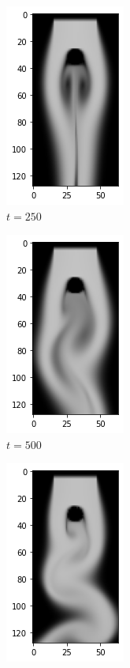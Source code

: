 \documentclass[a4paper,12pt,twoside]{report}
\begin{document}
\begin{figure}
	\centering
	\begin{subfigure}{0.18\textwidth}
		\centering
		\includegraphics[scale=0.5]{karmanflow/vgg_density_000250.png}
		\caption{$t=250$}
	\end{subfigure}
	\begin{subfigure}{0.18\textwidth}
		\centering
		\includegraphics[scale=0.5]{karmanflow/vgg_density_000500.png}
		\caption{$t=500$}
	\end{subfigure}
	\begin{subfigure}{0.18\textwidth}
		\centering
		\includegraphics[scale=0.5]{karmanflow/vgg_density_001000.png}

\end{subfigure}
\end{figure}
\end{document}
